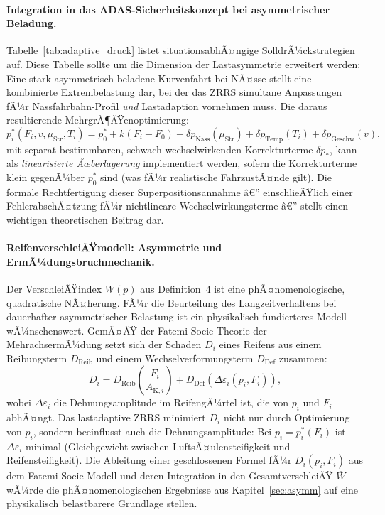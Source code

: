 ﻿\documentclass[a4paper,12pt]{article}
\theoremstyle{definition}
\begin{document}
\paragraph{Integration in das ADAS-Sicherheitskonzept bei asymmetrischer Beladung.}
Tabelle~\ref{tab:adaptive_druck} listet situationsabhÃ¤ngige SolldrÃ¼ckstrategien
auf. Diese Tabelle sollte um die Dimension der Lastasymmetrie erweitert werden:
Eine stark asymmetrisch beladene Kurvenfahrt bei NÃ¤sse stellt eine
kombinierte Extrembelastung dar, bei der das ZRRS simultane Anpassungen
fÃ¼r Nassfahrbahn-Profil \emph{und} Lastadaption vornehmen muss. Die daraus
resultierende MehrgrÃ¶ÃŸenoptimierung:
\[
    p^*_i(F_i, v, \mu_{\text{Str}}, T_i)
    = p^*_0 + k(F_i - F_0)
    + \delta p_{\text{Nass}}(\mu_{\text{Str}})
    + \delta p_{\text{Temp}}(T_i)
    + \delta p_{\text{Geschw}}(v),
\]
mit separat bestimmbaren, schwach wechselwirkenden Korrekturterme $\delta p_*$,
kann als \emph{linearisierte Ãœberlagerung} implementiert werden, sofern die
Korrekturterme klein gegenÃ¼ber $p^*_0$ sind (was fÃ¼r realistische
FahrzustÃ¤nde gilt). Die formale Rechtfertigung dieser Superpositionsannahme
â€” einschlieÃŸlich einer FehlerabschÃ¤tzung fÃ¼r nichtlineare Wechselwirkungs\-terme â€”
stellt einen wichtigen theoretischen Beitrag dar.

\paragraph{ReifenverschleiÃŸmodell: Asymmetrie und ErmÃ¼dungsbruchmechanik.}
Der VerschleiÃŸindex $W(p)$ aus Definition~4 ist eine phÃ¤nomenologische,
quadratische NÃ¤herung. FÃ¼r die Beurteilung des Langzeitverhaltens
bei dauerhafter asymmetrischer Belastung ist ein physikalisch fundierteres
Modell wÃ¼nschenswert. GemÃ¤ÃŸ der Fatemi-Socie-Theorie der Mehr\-achs\-ermÃ¼dung
\cite{fatemi} setzt sich der Schaden $D_i$ eines Reifens aus einem
Reibungsterm $D_{\text{Reib}}$ und einem Wechselverformungsterm
$D_{\text{Def}}$ zusammen:
\[
    D_i = D_{\text{Reib}}\!\left(\frac{F_i}{A_{\text{K},i}}\right)
    + D_{\text{Def}}\!\left(\Delta\varepsilon_i(p_i, F_i)\right),
\]
wobei $\Delta\varepsilon_i$ die Dehnungsamplitude im ReifengÃ¼rtel ist, die
von $p_i$ und $F_i$ abhÃ¤ngt. Das lastadaptive ZRRS minimiert $D_i$ nicht
nur durch Optimierung von $p_i$, sondern beeinflusst auch die
Dehnungsamplitude: Bei $p_i = p^*_i(F_i)$ ist $\Delta\varepsilon_i$ minimal
(Gleichgewicht zwischen LuftsÃ¤ulensteifigkeit und Reifensteifigkeit).
Die Ableitung einer geschlossenen Formel fÃ¼r $D_i(p_i, F_i)$ aus dem
Fatemi-Socie-Modell und deren Integration in den GesamtverschleiÃŸ
$\overline{W}$ wÃ¼rde die phÃ¤nomenologischen Ergebnisse aus
Kapitel~\ref{sec:asymm} auf eine physikalisch belastbarere Grundlage stellen.
\end{document}
